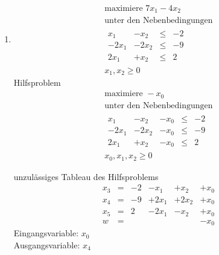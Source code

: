 \documentclass[a4paper]{scrartcl}
\begin{document}
\begin{enumerate}
\begin{enumerate}
            \item
                \begin{equation}
                    \begin{gathered}
                        \text{maximiere }
                        7x_1 -4x_2 \\
                        \text{unter den Nebenbedingungen} \\
                        \begin{array}{rrcr}
                            x_1 & -x_2  & \leq & -2 \\
                            -2x_1 & -2x_2 & \leq & -9 \\
                            2x_1 & +x_2  & \leq & 2
                        \end{array} \\
                        x_1, x_2 \geq 0
                    \end{gathered}
                \end{equation}
                Hilfsproblem
                \begin{equation}
                    \begin{gathered}
                        \text{maximiere }
                        -x_0 \\
                        \text{unter den Nebenbedingungen} \\
                        \begin{array}{rrrcr}
                            x_1 & -x_2  & -x_0 & \leq & -2 \\
                            -2x_1 & -2x_2 & -x_0 & \leq & -9 \\
                            2x_1 & +x_2  & -x_0 & \leq & 2
                        \end{array} \\
                        x_0, x_1, x_2 \geq 0
                    \end{gathered}
                \end{equation}
                
                unzulässiges Tableau des Hilfsproblems
                \begin{equation}
                    \begin{array}{rcrrrr}
                        x_3 & = & -2 & -x_1 & +x_2 & +x_0 \\
                        x_4 & = & -9 & +2x_1 & +2x_2 & +x_0 \\
                        x_5 & = & 2 & -2x_1 & -x_2 & +x_0 \\
                        \hline
                        w   & = & & & & -x_0
                    \end{array}
                \end{equation}
                Eingangsvariable: $x_0$ \\
                Ausgangsvariable: $x_4$ \\


\end{enumerate}
\end{enumerate}
\end{document}
